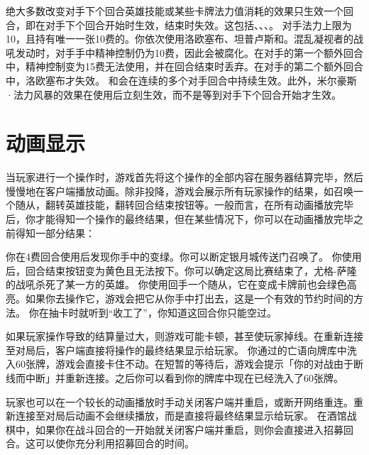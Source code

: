 \notice 绝大多数改变对手下个回合英雄技能或某些卡牌法力值消耗的效果只生效一个回合，即在对手下个回合开始时生效，结束时失效。这包括、、、。
\example 对手法力上限为10，且持有唯一一张10费的。你依次使用洛欧塞布、坦普卢斯和。混乱凝视者的战吼发动时，对手手中精神控制仍为10费，因此会被腐化。在对手的第一个额外回合中，精神控制变为15费无法使用，并在回合结束时丢弃。在对手的第二个额外回合中，洛欧塞布才失效。
\exception {}和会在连续的多个对手回合中持续生效。此外，米尔豪斯·法力风暴的效果在使用后立刻生效，而不是等到对手下个回合开始才生效。

\section{动画显示}
当玩家进行一个操作时，游戏首先将这个操作的全部内容在服务器结算完毕，然后慢慢地在客户端播放动画。除非投降，游戏会展示所有玩家操作的结果，如召唤一个随从，翻转英雄技能，翻转回合结束按钮等。一般而言，在所有动画播放完毕后，你才能得知一个操作的最终结果，但在某些情况下，你可以在动画播放完毕之前得知一部分结果：

\example 你在4费回合使用后发现你手中的变绿。你可以断定银月城传送门召唤了。
\example 你使用后，回合结束按钮变为黄色且无法按下。你可以确定这局比赛结束了，尤格-萨隆的战吼杀死了某一方的英雄。
\example 你使用回手一个随从，它在变成卡牌前也会绿色高亮。如果你去操作它，游戏会把它从你手中打出去，这是一个有效的节约时间的方法。
\example 你在抽卡时就听到“收工了”，你知道这回合你只能空过。

如果玩家操作导致的结算量过大，则游戏可能卡顿，甚至使玩家掉线。在重新连接至对局后，客户端直接将操作的最终结果显示给玩家。
\example 你通过的亡语向牌库中洗入60张牌，游戏会直接卡住不动。在短暂的等待后，游戏会提示「你的对战由于断线而中断」并重新连接。之后你可以看到你的牌库中现在已经洗入了60张牌。

玩家也可以在一个较长的动画播放时手动关闭客户端并重启，或断开网络重连。重新连接至对局后动画不会继续播放，而是直接将最终结果显示给玩家。
\example 在酒馆战棋中，如果你在战斗回合的一开始就关闭客户端并重启，则你会直接进入招募回合。这可以使你充分利用招募回合的时间。


